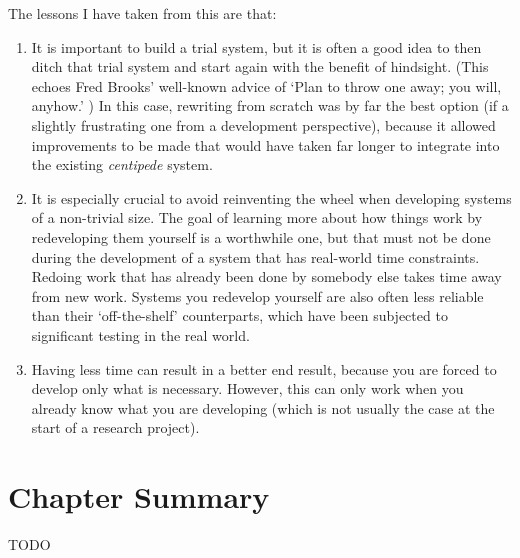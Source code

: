 %
The lessons I have taken from this are that:
%
\begin{enumerate}

\item It is important to build a trial system, but it is often a good idea to then ditch that trial system and start again with the benefit of hindsight. (This echoes Fred Brooks' well-known advice of `Plan to throw one away; you will, anyhow.' \cite{brooks74}) In this case, rewriting from scratch was by far the best option (if a slightly frustrating one from a development perspective), because it allowed improvements to be made that would have taken far longer to integrate into the existing \emph{centipede} system.

\item It is especially crucial to avoid reinventing the wheel when developing systems of a non-trivial size. The goal of learning more about how things work by redeveloping them yourself is a worthwhile one, but that must not be done during the development of a system that has real-world time constraints. Redoing work that has already been done by somebody else takes time away from new work. Systems you redevelop yourself are also often less reliable than their `off-the-shelf' counterparts, which have been subjected to significant testing in the real world.

\item Having less time can result in a better end result, because you are forced to develop only what is necessary. However, this can only work when you already know what you are developing (which is not usually the case at the start of a research project).

\end{enumerate}

\iffalse
+ Medium-size systems (30k+ lines of code each)
+ Implementation of millipede carefully planned with feature list -- very functional, but no unnecessary 'bells and whistles' / feature creep
+ The implementation of millipede proceeded rapidly and according to schedule
+ Consistent, maintainable code (particularly millipede)
+ millipede is entirely cross-platform -- built using CMake; works on Windows, Linux and Mac
+ Runs on normal consumer desktops / laptops
- Should have used ITK the first time round (instead of suffering from NIH syndrome)
- Should have written centipede to be cross-platform from the start
\fi

\section{Chapter Summary}

TODO
